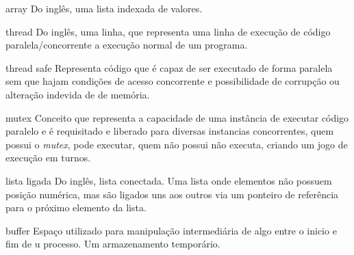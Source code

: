\begin{siglas}
    \item[array]             Do inglês, uma lista indexada de valores. 
    \item[thread]            Do inglês, uma linha, que representa uma linha de execução de código paralela/concorrente a execução normal de um programa.
    \item[thread safe]       Representa código que é capaz de ser executado de forma paralela sem que hajam condições de acesso concorrente e possibilidade de corrupção ou alteração indevida de de memória.
    \item[mutex]             Conceito que representa a capacidade de uma instância de executar código paralelo e é requisitado e liberado para diversas instancias concorrentes, quem possui o \textit{mutex}, pode executar, quem não possui não executa, criando um jogo de execução em turnos.  
    \item[lista ligada]       Do inglês, lista conectada. Uma lista onde elementos não possuem posição numérica, mas são ligados uns aos outros via um ponteiro de referência para o próximo elemento da lista.
    \item[buffer]            Espaço utilizado para manipulação intermediária de algo entre o inicio e fim de u processo. Um armazenamento temporário.   

\end{siglas}


\tableofcontents*
\cleardoublepage